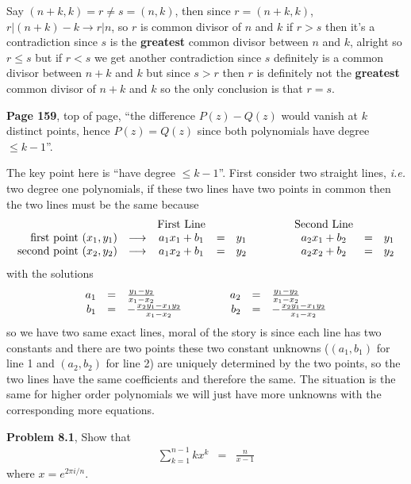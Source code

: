 \documentclass[aps,preprint,preprintnumbers,nofootinbib,showpacs,prd]{revtex4-1}
\newcommand{\ie}{{\it i.e.} }
\newcommand{\nbea}{\begin{eqnarray*}}
\newcommand{\neea}{\end{eqnarray*}}
\begin{document}
Say $(n+k,k) = r \neq s = (n,k)$, then since $r=(n+k,k)$, $r|(n+k)-k \to r|n$, so $r$ is common divisor of $n$ and $k$ if $r > s$ then it's a contradiction since $s$ is the {\bf greatest} common divisor between $n$ and $k$, alright so $r \le s$ but if $r < s$ we get another contradiction since $s$ definitely is a common divisor between $n+k$ and $k$ but since $s > r$ then $r$ is definitely not the {\bf greatest} common divisor of $n+k$ and $k$ so the only conclusion is that $r=s$.

{\bf Page 159}, top of page, ``the difference $P(z) - Q(z)$ would vanish at $k$ distinct points, hence $P(z)=Q(z)$ since both polynomials have degree $\le k-1$''.

The key point here is ``have degree $\le k-1$''. First consider two straight lines, \ie two degree one polynomials, if these two lines have two points in common then the two lines must be the same because 
%
\nbea
\begin{array}{r c c c l c c c l}
& & {\rm First~Line} & & & ~~~~~~~ & {\rm Second~Line} \\
{\rm first~point~} (x_1,y_1) & \longrightarrow & a_1 x_1 + b_1 & = & y_1 & ~~~~~~~ & a_2 x_1 + b_2 & = & y_1 \\
{\rm second~point~} (x_2,y_2) & \longrightarrow & a_1 x_2 + b_1 & = & y_2 & ~~~~~~~ & a_2 x_2 + b_2 & = & y_2
\end{array}
\neea
%
with the solutions
%
\nbea
\begin{array}{r c l c r c l}
a_1 & = & \frac{y_1-y_2}{x_1-x_2} & ~~~~~~~ & a_2 & = & \frac{y_1-y_2}{x_1-x_2} \\
b_1 & = & -\frac{x_2y_1-x_1y_2}{x_1-x_2} & ~~~~~~~ & b_2 & = & -\frac{x_2y_1-x_1y_2}{x_1-x_2}
\end{array}
\neea
%
so we have two same exact lines, moral of the story is since each line has two constants and there are two points these two constant unknowns ($(a_1,b_1)$ for line 1 and $(a_2,b_2)$ for line 2) are uniquely determined by the two points, so the two lines have the same coefficients and therefore the same. The situation is the same for higher order polynomials we will just have more unknowns with the corresponding more equations.

{\bf Problem 8.1}, Show that 
%
\nbea
\sum_{k=1}^{n-1}kx^k & = & \frac{n}{x-1}
\neea
%
where $x = e^{2\pi i / n}$.
\end{document}
